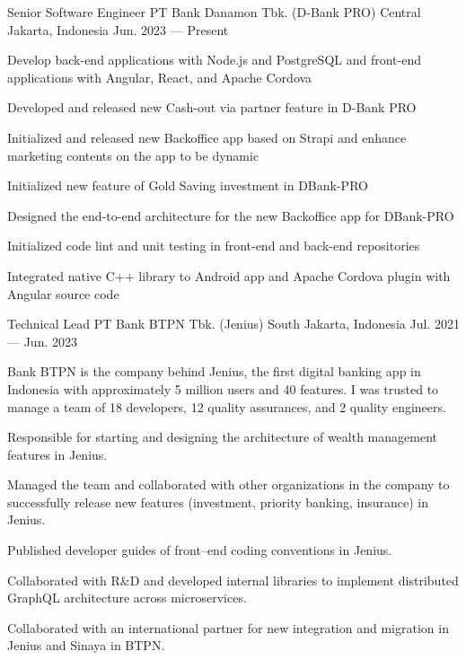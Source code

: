 

\begin{cventries}

  \cventry
  {Senior Software Engineer}
  {PT Bank Danamon Tbk. (D-Bank PRO)}
  {Central Jakarta, Indonesia}
  {Jun. 2023 --- Present}
  {
    \begin{cvitems}
      \item {Develop back-end applications with Node.js and PostgreSQL and front-end applications with Angular, React, and Apache Cordova}
      \item {Developed and released new Cash-out via partner feature in D-Bank PRO}
      \item {Initialized and released new Backoffice app based on Strapi and enhance marketing contents on the app to be dynamic}
      \item {Initialized new feature of Gold Saving investment in DBank-PRO}
      \item {Designed the end-to-end architecture for the new Backoffice app for DBank-PRO}
      \item {Initialized code lint and unit testing in front-end and back-end repositories}
      \item {Integrated native C++ library to Android app and Apache Cordova plugin with Angular source code}
    \end{cvitems}
  }

  \cventry
    {Technical Lead}
    {PT Bank BTPN Tbk. (Jenius)}
    {South Jakarta, Indonesia}
    {Jul. 2021 --- Jun. 2023}
    {
      \begin{cvitems}
        \item {Bank BTPN is the company behind Jenius, the first digital banking app in Indonesia with approximately 5 million users and 40 features. 
        I was trusted to manage a team of 18 developers, 12 quality assurances, and 2 quality engineers.}
        \item {Responsible for starting and designing the architecture of wealth management features in Jenius.}
        \item {Managed the team and collaborated with other organizations in the company to successfully release new features (investment, priority banking, insurance) in Jenius.}
        \item {Published developer guides of front--end coding conventions in Jenius.}
        \item {Collaborated with R\&D and developed internal libraries to implement distributed GraphQL architecture across microservices.}
        \item {Collaborated with an international partner for new integration and migration in Jenius and Sinaya in BTPN.}
      \end{cvitems}
    }


\end{cventries}
